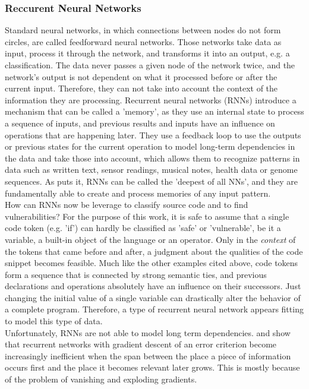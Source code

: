 \documentclass[
	a4paper,
	pagesize,
	pdftex,
	12pt,
	twoside, %
	BCOR=5mm, %
	ngerman,
	fleqn,
	final,
	]{scrartcl}
\begin{document}
\subsubsection{Reccurent Neural Networks}\label{RNN}
Standard neural networks, in which connections between nodes do not form circles, are called feedforward neural networks. Those networks take data as input, process it through the network, and transforms it into an output, e.g. a classification. The data never passes a given node of the network twice, and the network's output is not dependent on what it processed before or after the current input. Therefore, they can not take into account the context of the information they are processing. Recurrent neural networks (RNNs) introduce a mechanism that can be called a 'memory', as they use an internal state to process a sequence of inputs, and previous results and inputs have an influence on operations that are happening later. They use a feedback loop to use the outputs or previous states for the current operation to model long-term dependencies in the data and take those into account, which allows them to recognize patterns in data such as written text, sensor readings, musical notes, health data or genome sequences. As \cite{Schmidthuber.2015} puts it, RNNs can be called the 'deepest of all NNs', and they are fundamentally able to create and process memories of any input pattern.\\
How can RNNs now be leverage to classify source code and to find vulnerabilities? For the purpose of this work, it is safe to assume that a single code token (e.g. 'if') can hardly be classified as 'safe' or 'vulnerable', be it a variable, a built-in object of the language or an operator. Only in the \textit{context} of the tokens that came before and after, a judgment about the qualities of the code snippet becomes feasible. Much like the other examples cited above, code tokens form a sequence that is connected by strong semantic ties, and previous declarations and operations absolutely have an influence on their successors. Just changing the initial value of a single variable can drastically alter the behavior of a complete program. Therefore, a type of recurrent neural network appears fitting to model this type of data.\\
Unfortunately, RNNs are not able to model long term dependencies. \cite{Hochreiter.1991} and \cite{Bengio.1994} show that recurrent networks with gradient descent of an error criterion become increasingly inefficient when the span between the place a piece of information occurs first and the place it becomes relevant later grows. This is mostly because of the problem of vanishing and exploding gradients.\\
\end{document}
